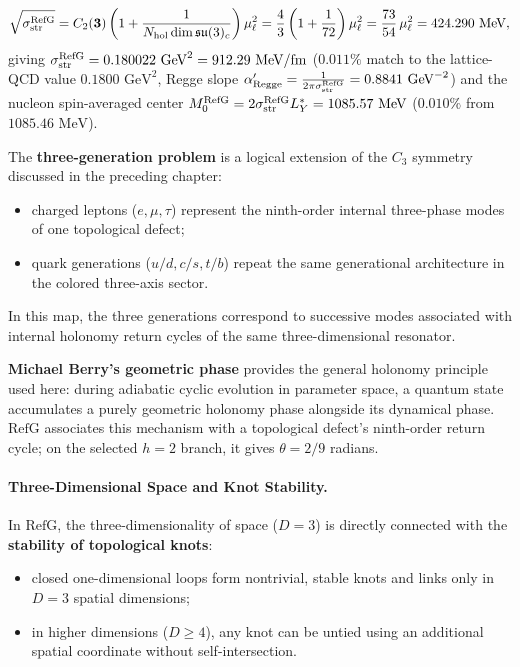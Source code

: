 \documentclass[11pt,a4paper]{article}
\newcommand{\RefG}{\mathrm{RefG}}
\begin{document}
\begin{enumerate}[label=\arabic*.]
\begin{equation}
\sqrt{\sigma_{\rm str}^{\rm RefG}} = C_2(\mathbf{3})\left(1 + \frac{1}{N_{\rm hol}\dim\mathfrak{su}(3)_c}\right)\mu_\ell^2 = \frac{4}{3}\left(1 + \frac{1}{72}\right)\mu_\ell^2 = \frac{73}{54}\,\mu_\ell^2 = 424.290\text{ MeV},
\end{equation}
giving \textbf{$\sigma_{\rm str}^{\rm RefG} = 0.180022\text{ GeV}^2 = 912.29\text{ MeV/fm}$} ($0.011\%$ match to the lattice-QCD value $0.1800\text{ GeV}^2$, Regge slope $\alpha'_{\rm Regge} = \frac{1}{2\pi\sigma_{\rm str}^{\rm RefG}} = 0.8841\text{ GeV}^{-2}$) and the nucleon spin-averaged center $M_0^{\rm RefG} = 2\sigma_{\rm str}^{\rm RefG}L_Y^* = 1085.57\text{ MeV}$ ($0.010\%$ from $1085.46\text{ MeV}$).
\end{enumerate}

The \textbf{three-generation problem} is a logical extension of the $C_3$ symmetry discussed in the preceding chapter:
\begin{itemize}
\item charged leptons ($e,\mu,\tau$) represent the ninth-order internal three-phase modes of one topological defect;
\item quark generations ($u/d,c/s,t/b$) repeat the same generational architecture in the colored three-axis sector.
\end{itemize}

In this map, the three generations correspond to successive modes associated with internal holonomy return cycles of the same three-dimensional resonator.

\textbf{Michael Berry's geometric phase} \citep{berry1984} provides the general holonomy principle used here: during adiabatic cyclic evolution in parameter space, a quantum state accumulates a purely geometric holonomy phase alongside its dynamical phase. $\RefG$ associates this mechanism with a topological defect's ninth-order return cycle; on the selected $h=2$ branch, it gives $\theta=2/9$ radians.

\paragraph{Three-Dimensional Space and Knot Stability.} In $\RefG$, the three-dimensionality of space ($D=3$) is directly connected with the \textbf{stability of topological knots}:
\begin{itemize}
\item closed one-dimensional loops form nontrivial, stable knots and links only in $D=3$ spatial dimensions;
\item in higher dimensions ($D\ge4$), any knot can be untied using an additional spatial coordinate without self-intersection.
\end{itemize}
\end{document}
